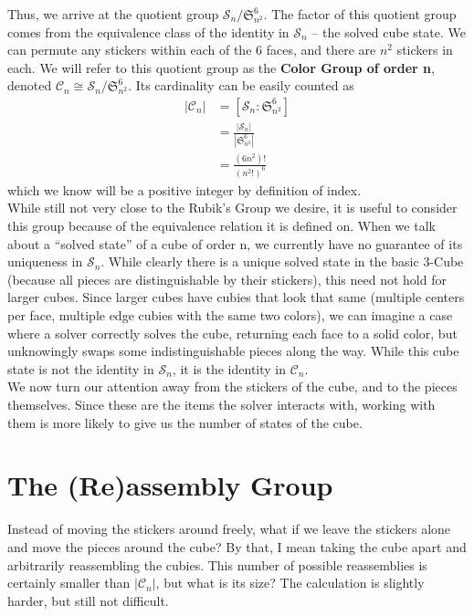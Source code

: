 \documentclass[10pt,letterpaper]{report}
\begin{document}
Thus, we arrive at the quotient group $\mathcal{S}_n \slash \mathfrak{S}_{n^2}^6$.  The factor of this quotient group comes from the equivalence class of the identity in $\mathcal{S}_n$ -- the solved cube state.  We can permute any stickers within each of the 6 faces, and there are $n^2$ stickers in each.  We will refer to this quotient group as the \textbf{Color Group of order n}, denoted $\mathcal{C}_n \cong \mathcal{S}_n \slash \mathfrak{S}_{n^2}^6$. Its cardinality can be easily counted as \begin{align*}
|\mathcal{C}_n| &= [\mathcal{S}_n : \mathfrak{S}_{n^2}^6] \\
&= \frac{|\mathcal{S}_n|}{|\mathfrak{S}_{n^2}^6|} \\
&= \frac{(6n^2)!}{(n^2!)^6}
\end{align*}
which we know will be a positive integer by definition of index. \\

While still not very close to the Rubik's Group we desire, it is useful to consider this group because of the equivalence relation it is defined on.  When we talk about a ``solved state'' of a cube of order n, we currently have no guarantee of its uniqueness in $\mathcal{S}_n$.  While clearly there is a unique solved state in the basic 3-Cube (because all pieces are distinguishable by their stickers), this need not hold for larger cubes.  Since larger cubes have cubies that look that same (multiple centers per face, multiple edge cubies with the same two colors), we can imagine a case where a solver correctly solves the cube, returning each face to a solid color, but unknowingly swaps some indistinguishable pieces along the way.  While this cube state is not the identity in $\mathcal{S}_n$, it is the identity in $\mathcal{C}_n$. \\

We now turn our attention away from the stickers of the cube, and to the pieces themselves.  Since these are the items the solver interacts with, working with them is more likely to give us the number of states of the cube.

\section{The (Re)assembly Group}
Instead of moving the stickers around freely, what if we leave the stickers alone and move the pieces around the cube?  By that, I mean taking the cube apart and arbitrarily reassembling the cubies.  This number of possible reassemblies is certainly smaller than $|\mathcal{C}_n|$, but what is its size?  The calculation is slightly harder, but still not difficult. \\
\end{document}
